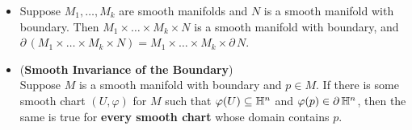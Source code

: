 \documentclass[11pt]{article}
\begin{document}
\begin{itemize}
\item \begin{proposition}
Suppose $M_1 ,\ldots, M_k$ are smooth manifolds and $N$ is a smooth manifold with boundary. Then $M_1 \times \ldots \times M_k \times N$ is a smooth manifold with boundary, and $\partial\,(M_1 \times \ldots \times M_k \times N) = M_1 \times \ldots \times M_k \times \partial\,N$.
\end{proposition}

\item \begin{theorem} (\textbf{Smooth Invariance of the Boundary}) \citep{lee2003introduction}\\ 
Suppose $M$ is a smooth manifold with boundary and $p \in M$. If there is some smooth chart $(U, \varphi)$ for $M$ such that $\varphi(U) \subseteq {\mathbb H}^n$ and $\varphi(p) \in \partial\,{\mathbb H}^n$, then the same is true for \textbf{every smooth chart} whose domain contains $p$.
\end{theorem}
\end{itemize}

\newpage


\end{document}
